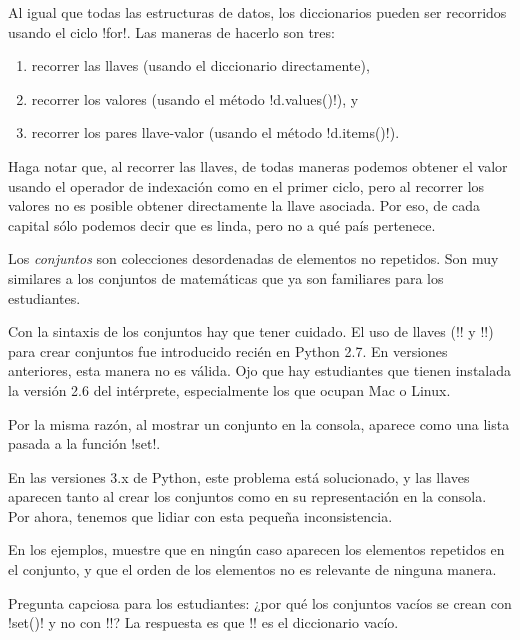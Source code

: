 \documentclass[10pt]{article}
\begin{document}

  Al igual que todas las estructuras de datos,
  los diccionarios pueden ser recorridos usando el ciclo \li!for!.
  Las maneras de hacerlo son tres:
  \begin{enumerate}
    \item recorrer las llaves (usando el diccionario directamente),
    \item recorrer los valores (usando el método \li!d.values()!), y
    \item recorrer los pares llave-valor (usando el método \li!d.items()!).
  \end{enumerate}

  Haga notar que, al recorrer las llaves,
  de todas maneras podemos obtener el valor usando el operador de indexación
  como en el primer ciclo,
  pero al recorrer los valores no es posible obtener directamente la llave asociada.
  Por eso, de cada capital sólo podemos decir que es linda, pero no a qué país pertenece.


  Los \emph{conjuntos} son colecciones desordenadas de elementos no repetidos.
  Son muy similares a los conjuntos de matemáticas
  que ya son familiares para los estudiantes.

  Con la sintaxis de los conjuntos hay que tener cuidado.
  El uso de llaves (\li!{! y \li!}!) para crear conjuntos
  fue introducido recién en Python 2.7.
  En versiones anteriores, esta manera no es válida.
  Ojo que hay estudiantes que tienen instalada la versión 2.6 del intérprete,
  especialmente los que ocupan Mac o Linux.

  Por la misma razón,
  al mostrar un conjunto en la consola,
  aparece como una lista pasada a la función \li!set!.

  En las versiones 3.x de Python,
  este problema está solucionado,
  y las llaves aparecen tanto al crear los conjuntos
  como en su representación en la consola.
  Por ahora, tenemos que lidiar con esta pequeña inconsistencia.

  En los ejemplos,
  muestre que en ningún caso aparecen los elementos repetidos en el conjunto,
  y que el orden de los elementos no es relevante de ninguna manera.


  Pregunta capciosa para los estudiantes:
  ¿por qué los conjuntos vacíos se crean con \li!set()! y no con \li!{}!?
  La respuesta es que \li!{}! es el diccionario vacío.
\end{document}
